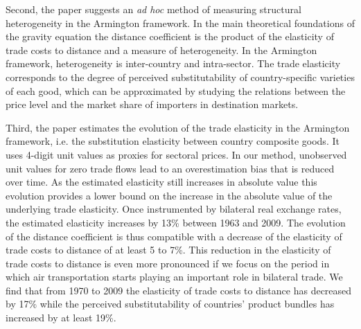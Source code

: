 \documentclass[12pt,twoside,a4paper,notitlepage]{article}
\newcommand{\revLA}[1]{\textcolor{red}{\footnotesize\textit{{revLA: #1}}}} %
\def\revLA #1{} %
\begin{document}
{Second, the paper suggests an \textit{ad hoc} method of measuring structural heterogeneity in the Armington framework.
In the main theoretical foundations of the gravity equation the distance coefficient is the product of the elasticity of trade costs to distance and a measure of heterogeneity.
In the Armington framework, heterogeneity is inter-country and intra-sector.
The trade elasticity corresponds to the degree of perceived substitutability of country-specific varieties of each good, which can be approximated by studying the relations between the price level and the market share of importers in destination markets.

Third, the paper estimates the evolution of the trade elasticity in the Armington framework, i.e.
the substitution elasticity between country composite goods.
It uses 4-digit unit values as proxies for sectoral prices.
In our method, unobserved unit values for zero trade flows lead to an overestimation bias that is reduced over time.
As the estimated elasticity still increases in absolute value this%
 evolution provides a lower bound on the increase in the absolute value of the underlying trade elasticity.
Once instrumented by bilateral real exchange rates, the estimated elasticity increases by 13\% between 1963 and 2009.
The evolution of the distance coefficient is thus compatible with a decrease of the elasticity of trade costs to distance of at least 5 to 7\%.
This reduction in the elasticity of trade costs to distance is even more pronounced if we focus on the period in which air transportation starts playing an important role in bilateral trade.
We find that from 1970 to 2009 the elasticity of trade costs to distance has decreased by 17\% while the perceived substitutability of countries' product bundles has increased by at least 19\%.



%

%


\clearpage
\appendix
\revLA{I updated numbers in the text and graphs by defining the superbalanced sample for 1962-2013.}
}
\end{document}
